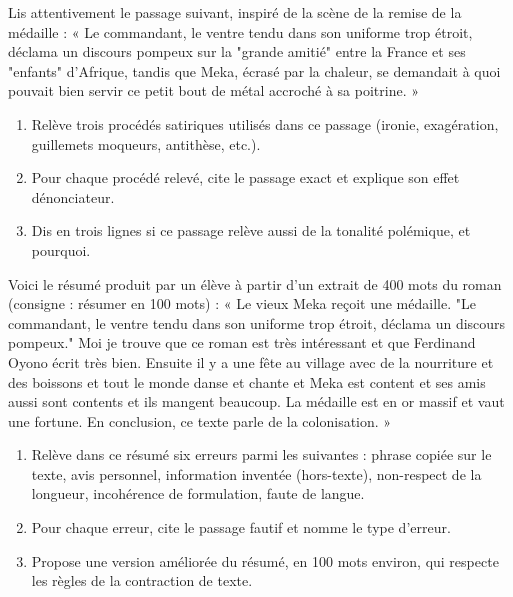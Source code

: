 \documentclass[11pt]{article}
\newcounter{popsec}
\newcounter{popsub}
\newcommand{\courssub}[1]{%
  \stepcounter{popsub}%
  \par\vspace{9pt}\noindent{\popxbold\fontsize{11.5}{13}\selectfont\color{popink}{\color{poporange}\thepopsec.\thepopsub}\hspace{6pt}#1}\par\nopagebreak\vspace{4pt}
}
\begin{document}
\begin{exercice}
Lis attentivement le passage suivant, inspiré de la scène de la remise de la médaille : « Le commandant, le ventre tendu dans son uniforme trop étroit, déclama un discours pompeux sur la "grande amitié" entre la France et ses "enfants" d'Afrique, tandis que Meka, écrasé par la chaleur, se demandait à quoi pouvait bien servir ce petit bout de métal accroché à sa poitrine. »
\begin{enumerate}
\item Relève trois procédés satiriques utilisés dans ce passage (ironie, exagération, guillemets moqueurs, antithèse, etc.).
\item Pour chaque procédé relevé, cite le passage exact et explique son effet dénonciateur.
\item Dis en trois lignes si ce passage relève aussi de la tonalité polémique, et pourquoi.
\end{enumerate}
\end{exercice}

\begin{exercice}
Voici le résumé produit par un élève à partir d'un extrait de 400 mots du roman (consigne : résumer en 100 mots) : « Le vieux Meka reçoit une médaille. "Le commandant, le ventre tendu dans son uniforme trop étroit, déclama un discours pompeux." Moi je trouve que ce roman est très intéressant et que Ferdinand Oyono écrit très bien. Ensuite il y a une fête au village avec de la nourriture et des boissons et tout le monde danse et chante et Meka est content et ses amis aussi sont contents et ils mangent beaucoup. La médaille est en or massif et vaut une fortune. En conclusion, ce texte parle de la colonisation. »
\begin{enumerate}
\item Relève dans ce résumé six erreurs parmi les suivantes : phrase copiée sur le texte, avis personnel, information inventée (hors-texte), non-respect de la longueur, incohérence de formulation, faute de langue.
\item Pour chaque erreur, cite le passage fautif et nomme le type d'erreur.
\item Propose une version améliorée du résumé, en 100 mots environ, qui respecte les règles de la contraction de texte.
\end{enumerate}
\end{exercice}

\courssub{Je me prépare au Bac}
\end{document}
